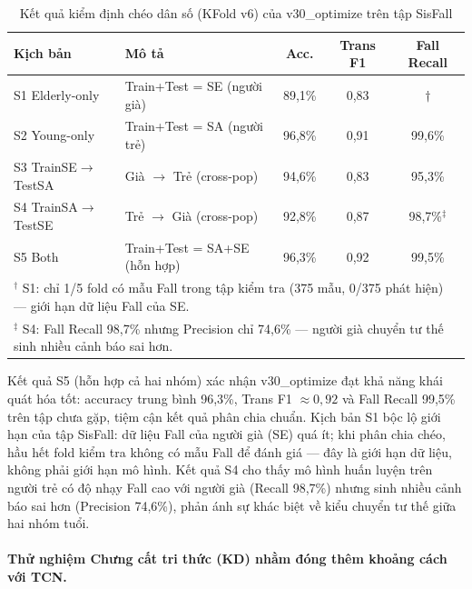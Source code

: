 \documentclass[../DoAn.tex]{subfiles}
\begin{document}
\begin{table}[H]
\centering
\caption{Kết quả kiểm định chéo dân số (KFold v6) của v30\_optimize trên tập SisFall}
\label{tab:kfold_v6}
\small
\begin{tabular}{|l|p{3.2cm}|c|c|c|}
\hline
\textbf{Kịch bản} & \textbf{Mô tả} & \textbf{Acc.} & \textbf{Trans F1} & \textbf{Fall Recall} \\
\hline
S1 Elderly-only & Train+Test = SE (người già)           & 89,1\% & 0,83 & $\dagger$ \\
S2 Young-only   & Train+Test = SA (người trẻ)           & 96,8\% & 0,91 & 99,6\% \\
S3 TrainSE$\to$TestSA & Già $\to$ Trẻ (cross-pop)      & 94,6\% & 0,83 & 95,3\% \\
S4 TrainSA$\to$TestSE & Trẻ $\to$ Già (cross-pop)      & 92,8\% & 0,87 & 98,7\%$^{\ddagger}$ \\
S5 Both         & Train+Test = SA+SE (hỗn hợp)          & 96,3\% & 0,92 & 99,5\% \\
\hline
\multicolumn{5}{|l|}{\footnotesize $^\dagger$ S1: chỉ 1/5 fold có mẫu Fall trong tập kiểm tra (375 mẫu, 0/375 phát hiện) --- giới hạn dữ liệu Fall của SE.} \\
\multicolumn{5}{|l|}{\footnotesize $^{\ddagger}$ S4: Fall Recall 98,7\% nhưng Precision chỉ 74,6\% --- người già chuyển tư thế sinh nhiều cảnh báo sai hơn.} \\
\hline
\end{tabular}
\end{table}

Kết quả S5 (hỗn hợp cả hai nhóm) xác nhận v30\_optimize đạt khả năng khái quát hóa tốt: accuracy trung bình 96,3\%, Trans F1 $\approx 0{,}92$ và Fall Recall 99,5\% trên tập chưa gặp, tiệm cận kết quả phân chia chuẩn. Kịch bản S1 bộc lộ giới hạn của tập SisFall: dữ liệu Fall của người già (SE) quá ít; khi phân chia chéo, hầu hết fold kiểm tra không có mẫu Fall để đánh giá --- đây là giới hạn dữ liệu, không phải giới hạn mô hình. Kết quả S4 cho thấy mô hình huấn luyện trên người trẻ có độ nhạy Fall cao với người già (Recall 98,7\%) nhưng sinh nhiều cảnh báo sai hơn (Precision 74,6\%), phản ánh sự khác biệt về kiểu chuyển tư thế giữa hai nhóm tuổi.

\paragraph{Thử nghiệm Chưng cất tri thức (KD) nhằm đóng thêm khoảng cách với TCN.}
\end{document}
